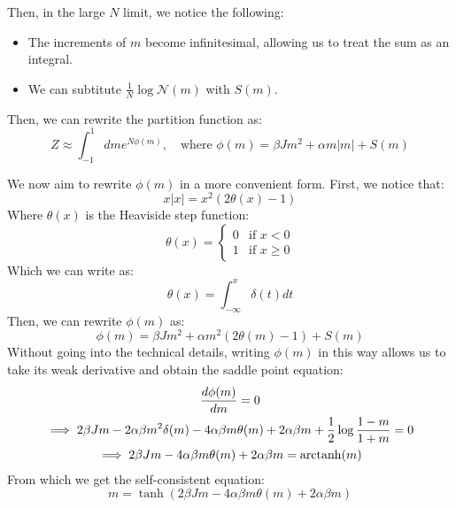 Then, in the large $N$ limit, we notice the following:
\begin{itemize}
    \item The increments of $m$ become infinitesimal, allowing us to treat the sum as an integral.
    \item We can subtitute $\frac{1}{N}\log\mathcal{N}(m)$ with $S(m)$.
\end{itemize}
Then, we can rewrite the partition function as:
\begin{equation}
    Z \approx \int_{-1}^{1} dm e^{N\phi(m)}, \quad \text{where }
    \phi(m) = \beta J m^2 + \alpha m |m| + S(m)
    \label{eq:bornholdt_phi}
\end{equation}


We now aim to rewrite $\phi(m)$ in a more convenient form. First, we notice that:
\begin{equation}
    x|x| = x^2 (2\theta(x)-1)
\end{equation}
Where $\theta(x)$ is the Heaviside step function:
\begin{equation}
    \theta(x) = \begin{cases}
        0 & \text{if } x < 0\\
        1 & \text{if } x \geq 0
    \end{cases}
\end{equation}
Which we can write as:
\begin{equation}
    \theta(x) = \int_{-\infty}^{x} \delta(t) dt
\end{equation}
Then, we can rewrite $\phi(m)$ as:
\begin{equation}
    \phi(m) = \beta J m^2 + \alpha m^2 (2\theta(m)-1) + S(m)
\end{equation}
Without going into the technical details, writing $\phi(m)$ in this way allows us to take its weak derivative and obtain the saddle point equation:
\begin{equation}
    \begin{gathered}
        \frac{d \phi(m)}{d m} = 0\\
        \implies 2\beta J m - 2 \alpha \beta m^2 \delta(m) - 4 \alpha \beta m \theta(m) + 2\alpha \beta m + \frac{1}{2} \log \frac{1-m}{1+m} = 0\\
        \implies 2\beta J m - 4 \alpha \beta m \theta(m) + 2\alpha \beta m = \operatorname{arctanh}(m)\\
    \end{gathered}
\end{equation}
From which we get the self-consistent equation:
\begin{equation}
    m = \tanh\left(2\beta J m - 4 \alpha \beta m \theta(m) + 2\alpha \beta m\right)
    \label{eq:bornholdt_self_consistent}
\end{equation}

